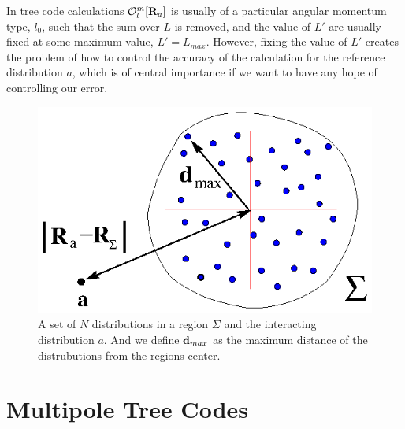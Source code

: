 \documentclass[prb,aps,nobibnotes,twocolumn,doublespace,twocolumngrid,superbib]{revtex4}
\begin{document}
%
In tree code calculations ${\cal O}_{l}^{m}[\mathbf{R}_{a}]$ is usually of a particular angular 
momentum type, $l_0$, such that the sum over $L$ is removed, and the value of $L'$ are usually fixed at 
some maximum value, $L'=L_{max}$.
%
However, fixing the value of $L'$ creates the problem of how to control the accuracy of the calculation 
for the reference distribution $a$, which is of central importance if we want to have any hope of 
controlling our error.

%
%
\begin{figure}
\caption{A set of $N$ distributions in a region $\Sigma$ and the interacting distribution $a$.
And we define ${\bf d}_{max}$ as the maximum distance of the distrubutions from the regions center.}
{\centering \includegraphics {MultInBox.ps} \par} 
\label{figure:MultInBox} 
\end{figure}

\section{Multipole Tree Codes}
\end{document}
